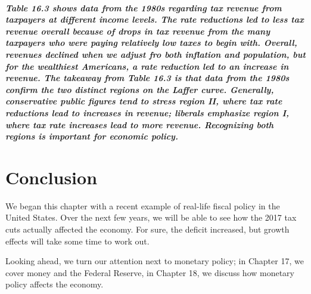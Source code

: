 \documentclass[11pt]{article} %
\begin{document}
\subparagraph*{Table 16.3 shows data from the 1980s regarding tax revenue from taxpayers at different income levels. The rate reductions led to less tax revenue overall because of drops in tax revenue from the many taxpayers who were paying relatively low taxes to begin with. Overall, revenues declined when we adjust fro both inflation and population, but for the wealthiest Americans, a rate reduction led to an increase in revenue. The takeaway from Table 16.3 is that data from the 1980s confirm the two distinct regions on the Laffer curve. Generally, conservative public figures tend to stress region II, where tax rate reductions lead to increases in revenue; liberals emphasize region I, where tax rate increases lead to more revenue. Recognizing both regions is important for economic policy.}

\section*{Conclusion}
We began this chapter with a recent example of real-life fiscal policy in the United States. Over the next few years, we will be able to see how the 2017 tax cuts actually affected the economy. For sure, the deficit increased, but growth effects will take some time to work out.

Looking ahead, we turn our attention next to monetary policy; in Chapter 17, we cover money and the Federal Reserve, in Chapter 18, we discuss how monetary policy affects the economy.
\end{document}
